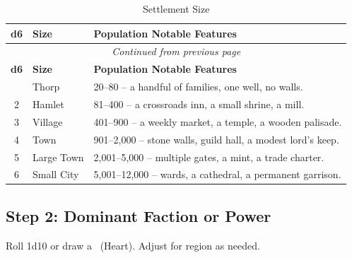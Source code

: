\begin{center}
\begin{longtable}{cll}
\caption{Settlement Size}\\
\toprule
\textbf{d6} & \textbf{Size} & \textbf{Population \quad Notable Features} \\
\midrule
\endfirsthead
\multicolumn{3}{c}{\emph{Continued from previous page}} \\
\toprule
\textbf{d6} & \textbf{Size} & \textbf{Population \quad Notable Features} \\
\midrule
\endhead
\bottomrule
\endfoot
1 & Thorp & 20--80 -- a handful of families, one well, no walls. \\
2 & Hamlet & 81--400 -- a crossroads inn, a small shrine, a mill. \\
3 & Village & 401--900 -- a weekly market, a temple, a wooden palisade. \\
4 & Town & 901--2,000 -- stone walls, guild hall, a modest lord's keep. \\
5 & Large Town & 2,001--5,000 -- multiple gates, a mint, a trade charter. \\
6 & Small City & 5,001--12,000 -- wards, a cathedral, a permanent garrison. \\
\end{longtable}
\end{center}

\subsection{Step 2: Dominant Faction or Power}
\label{sec:settlement-faction}
Roll 1d10 or draw a \heartsuit\ (Heart). Adjust for region as needed.

